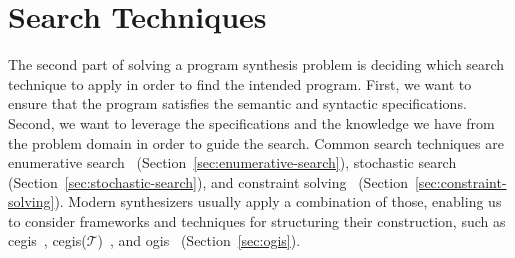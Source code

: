 \section{Search Techniques}
\label{sec:search-techniques}

The second part of solving a program synthesis problem is deciding which search
technique to apply in order to find the intended program.
First, we want to ensure that the program satisfies the semantic and syntactic
specifications.
Second, we want to leverage the specifications and the knowledge we have from
the problem domain in order to guide the search.
Common search techniques are
enumerative search~\cite{Phothilimthana:2016:SUS,Alur:2017:SEP}
(Section~\ref{sec:enumerative-search}),
stochastic search~\cite{Schkufza:2013:SS,Singh:ranking:2015}
(Section~\ref{sec:stochastic-search}), and
constraint solving~\cite{Feng:2018:PSU,Feng:2017:CST,Feng:2017:CSC}
(Section~\ref{sec:constraint-solving}).
Modern synthesizers usually apply a combination of those, enabling us to
consider frameworks and techniques for structuring their construction, such as
\gls{cegis}~\cite{Solar-Lezama:2008},
\gls{cegis}($\mathcal{T}$)~\cite{Abate:2018:CMT}, and
\gls{ogis}~\cite{Jha:2017:TFS}
(Section~\ref{sec:ogis}).


% 





